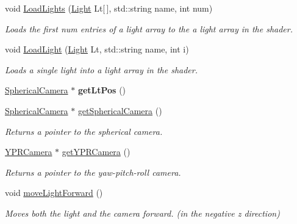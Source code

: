 \begin{DoxyCompactItemize}
void \hyperlink{class_graphics_engine_a269f114b7d1b964401074213e5145f47}{Load\+Lights} (\hyperlink{class_light}{Light} Lt\mbox{[}$\,$\mbox{]}, std\+::string name, int num)
\begin{DoxyCompactList}\small\item\em Loads the first num entries of a light array to the a light array in the shader. \end{DoxyCompactList}\item 
void \hyperlink{class_graphics_engine_ab58f167e0bd7aa6cfd59ad31b01ac4fd}{Load\+Light} (\hyperlink{class_light}{Light} Lt, std\+::string name, int i)
\begin{DoxyCompactList}\small\item\em Loads a single light into a light array in the shader. \end{DoxyCompactList}\item 
\mbox{\label{class_graphics_engine_ad7ed9774587ef174dde420779153d7a0}} 
\hyperlink{class_spherical_camera}{Spherical\+Camera} $\ast$ {\bfseries get\+Lt\+Pos} ()
\item 
\mbox{\label{class_graphics_engine_a08fa5ea5485b0bab2d902dd71ac995d9}} 
\hyperlink{class_spherical_camera}{Spherical\+Camera} $\ast$ \hyperlink{class_graphics_engine_a08fa5ea5485b0bab2d902dd71ac995d9}{get\+Spherical\+Camera} ()
\begin{DoxyCompactList}\small\item\em Returns a pointer to the spherical camera. \end{DoxyCompactList}\item 
\mbox{\label{class_graphics_engine_a99c1b6f36ce3c8e02cba2a97b08eab05}} 
\hyperlink{class_y_p_r_camera}{Y\+P\+R\+Camera} $\ast$ \hyperlink{class_graphics_engine_a99c1b6f36ce3c8e02cba2a97b08eab05}{get\+Y\+P\+R\+Camera} ()
\begin{DoxyCompactList}\small\item\em Returns a pointer to the yaw-\/pitch-\/roll camera. \end{DoxyCompactList}\item 
\mbox{\label{class_graphics_engine_af0477b7e18db5e616f2917db0d75b8a5}} 
void \hyperlink{class_graphics_engine_af0477b7e18db5e616f2917db0d75b8a5}{move\+Light\+Forward} ()
\begin{DoxyCompactList}\small\item\em Moves both the light and the camera forward. (in the negative z direction) \end{DoxyCompactList}\item 

\end{DoxyCompactItemize}
